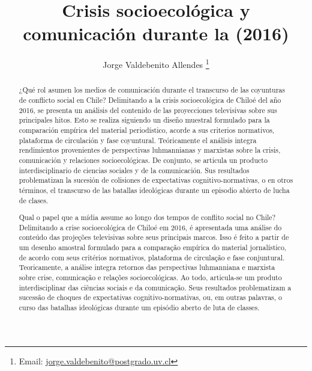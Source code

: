 \documentclass{textolivre}
\title{Crisis socioecológica y comunicación durante la \NoCaseChange{Marea Roja de Chiloé} (2016)}
\author[1]{Jorge Valdebenito Allendes \orcid{0000-0003-3249-1855} \thanks{Email: \url{jorge.valdebenito@postgrado.uv.cl}}}
\affil[1]{Universidad de Valparaíso, Chile.}
\begin{document}
\maketitle

\begin{polyabstract}
\begin{abstract}
¿Qué rol asumen los medios de comunicación durante el transcurso de las
coyunturas de conflicto social en Chile? Delimitando a la crisis socioecológica de Chiloé
del año 2016, se presenta un análisis del contenido de las proyecciones televisivas sobre
sus principales hitos. Esto se realiza siguiendo un diseño muestral formulado para la
comparación empírica del material periodístico, acorde a sus criterios normativos,
plataforma de circulación y fase coyuntural. Teóricamente el análisis integra rendimientos
provenientes de perspectivas luhmannianas y marxistas sobre la crisis, comunicación y
relaciones socioecológicas. De conjunto, se articula un producto interdisciplinario de
ciencias sociales y de la comunicación. Sus resultados problematizan la sucesión de
colisiones de expectativas cognitivo-normativas, o en otros términos, el transcurso de las
batallas ideológicas durante un episodio abierto de lucha de clases.

\end{abstract}

\begin{portuguese}
\begin{abstract}
Qual o papel que a mídia assume ao longo dos tempos de conflito social no
Chile? Delimitando a crise socioecológica de Chiloé em 2016, é apresentada uma análise
do conteúdo das projeções televisivas sobre seus principais marcos. Isso é feito a partir
de um desenho amostral formulado para a comparação empírica do material jornalístico,
de acordo com seus critérios normativos, plataforma de circulação e fase conjuntural.
Teoricamente, a análise integra retornos das perspectivas luhmanniana e marxista sobre
crise, comunicação e relações socioecológicas. Ao todo, articula-se um produto
interdisciplinar das ciências sociais e da comunicação. Seus resultados problematizam a
sucessão de choques de expectativas cognitivo-normativas, ou, em outras palavras, o
curso das batalhas ideológicas durante um episódio aberto de luta de classes.

\end{abstract}
\end{portuguese}


\end{polyabstract}
\end{document}
